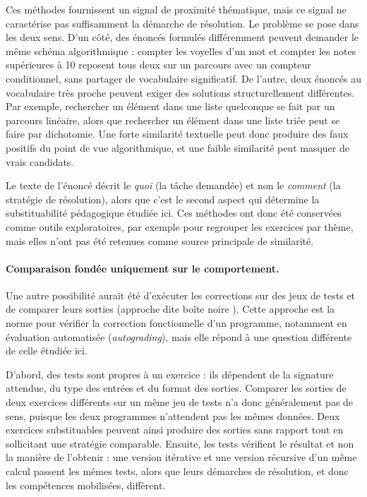 Ces méthodes fournissent un signal de proximité thématique, mais ce signal ne
caractérise pas suffisamment la démarche de résolution. Le problème se pose
dans les deux sens. D'un côté, des énoncés formulés différemment peuvent
demander le même schéma algorithmique : \og compter les voyelles d'un mot \fg{}
et \og compter les notes supérieures à 10 \fg{} reposent tous deux sur un
parcours avec un compteur conditionnel, sans partager de vocabulaire
significatif. De l'autre, deux énoncés au vocabulaire très proche peuvent
exiger des solutions structurellement différentes. Par exemple, rechercher un
élément dans une liste quelconque se fait par un parcours linéaire, alors que
rechercher un élément dans une liste triée peut se faire par dichotomie. Une
forte similarité textuelle peut donc produire des faux positifs du point de
vue algorithmique, et une faible similarité peut masquer de vrais candidats.

Le texte de l'énoncé décrit le \emph{quoi} (la tâche demandée) et non le
\emph{comment} (la stratégie de résolution), alors que c'est le second aspect
qui détermine la substituabilité pédagogique étudiée ici. Ces méthodes ont
donc été conservées comme outils exploratoires, par exemple pour regrouper
les exercices par thème, mais elles n'ont pas été retenues comme source
principale de similarité.

\paragraph{Comparaison fondée uniquement sur le comportement.}

Une autre possibilité aurait été d'exécuter les corrections sur des jeux de
tests et de comparer leurs sorties (approche dite \og boîte noire \fg{}). Cette
approche est la norme pour vérifier la correction fonctionnelle d'un
programme, notamment en évaluation automatisée (\emph{autograding}), mais elle
répond à une question différente de celle étudiée ici.

D'abord, des tests sont propres à un exercice : ils dépendent de la signature
attendue, du type des entrées et du format des sorties. Comparer les sorties
de deux exercices différents sur un même jeu de tests n'a donc généralement
pas de sens, puisque les deux programmes n'attendent pas les mêmes données.
Deux exercices substituables peuvent ainsi produire des sorties sans rapport
tout en sollicitant une stratégie comparable. Ensuite, les tests vérifient le
résultat et non la manière de l'obtenir : une version itérative et une
version récursive d'un même calcul passent les mêmes tests, alors que leurs
démarches de résolution, et donc les compétences mobilisées, diffèrent.


